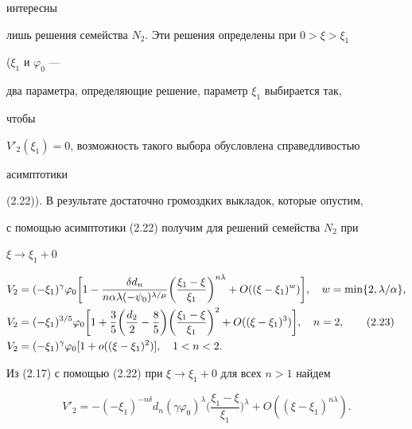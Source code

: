интересны 


лишь решения семейства $N_2$. Эти решения определены при $0>\xi>\xi_1$ 


($\xi_1$ и $\varphi_0$ --- 


два параметра, определяющие решение, параметр $\xi_1$ выбирается так, 


чтобы 


$V'_2(\xi_1)=0$, возможность такого выбора обусловлена справедливостью 


асимптотики 


(2.22)). В результате достаточно громоздких выкладок, которые опустим, 


с помощью асимптотики (2.22) получим для решений семейства $N_2$ при 


$\xi\to\xi_1+0$ 


\begin{align} 


V_2&=(-\xi_1)^\gamma \varphi_0\bigg[1- 


\frac{\delta d_n}{n\alpha\lambda(-\psi_0)^{\lambda/\mu}} 


\bigg(\frac{\xi_1-\xi}{\xi_1}\bigg)^{n\lambda}+ 


O((\xi-\xi_1)^w)\bigg],\quad w=\min\{2,\lambda/\alpha \},\notag \\ 


% 


V_2&=(-\xi_1)^{3/5}\varphi_0\bigg[1+\frac{3}{5}\bigg( 


\frac{d_2}{2}-\frac{8}{5}\bigg)\bigg(\frac{\xi_1-\xi}{\xi_1} 


\bigg)^2+O((\xi-\xi_1)^3)\bigg],\quad n=2, \tag{2.23} \\ 


% 


V_2&=(-\xi_1)^\gamma \varphi_0[1+o((\xi-\xi_1)^2)],\quad 


1<n<2.\notag 


\end{align} 


Из (2.17) с помощью (2.22) при $\xi\to\xi_1+0$ для всех $n>1$ найдем 


\begin{equation} 


V'_2=-(-\xi_1)^{-n\delta}d_n(\gamma\varphi_0)^\lambda 


\bigg(\frac{\xi_1-\xi}{\xi_1} \bigg)^\lambda+ 


O((\xi-\xi_1)^{n\lambda}).\tag{2.24} 


\end{equation} 


